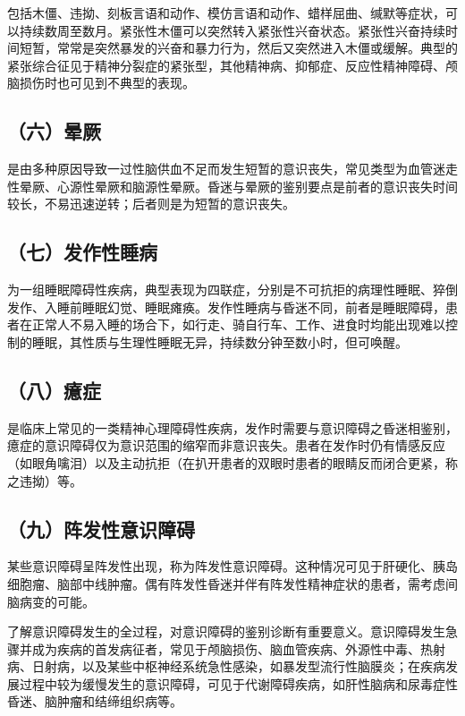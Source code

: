 包括木僵、违拗、刻板言语和动作、模仿言语和动作、蜡样屈曲、缄默等症状，可以持续数周至数月。紧张性木僵可以突然转入紧张性兴奋状态。紧张性兴奋持续时间短暂，常常是突然暴发的兴奋和暴力行为，然后又突然进入木僵或缓解。典型的紧张综合征见于精神分裂症的紧张型，其他精神病、抑郁症、反应性精神障碍、颅脑损伤时也可见到不典型的表现。

\subsection{（六）晕厥}

是由多种原因导致一过性脑供血不足而发生短暂的意识丧失，常见类型为血管迷走性晕厥、心源性晕厥和脑源性晕厥。昏迷与晕厥的鉴别要点是前者的意识丧失时间较长，不易迅速逆转；后者则是为短暂的意识丧失。

\subsection{（七）发作性睡病}

为一组睡眠障碍性疾病，典型表现为四联症，分别是不可抗拒的病理性睡眠、猝倒发作、入睡前睡眠幻觉、睡眠瘫痪。发作性睡病与昏迷不同，前者是睡眠障碍，患者在正常人不易入睡的场合下，如行走、骑自行车、工作、进食时均能出现难以控制的睡眠，其性质与生理性睡眠无异，持续数分钟至数小时，但可唤醒。

\subsection{（八）癔症}

是临床上常见的一类精神心理障碍性疾病，发作时需要与意识障碍之昏迷相鉴别，癔症的意识障碍仅为意识范围的缩窄而非意识丧失。患者在发作时仍有情感反应（如眼角噙泪）以及主动抗拒（在扒开患者的双眼时患者的眼睛反而闭合更紧，称之违拗）等。

\subsection{（九）阵发性意识障碍}

某些意识障碍呈阵发性出现，称为阵发性意识障碍。这种情况可见于肝硬化、胰岛细胞瘤、脑部中线肿瘤。偶有阵发性昏迷并伴有阵发性精神症状的患者，需考虑间脑病变的可能。

了解意识障碍发生的全过程，对意识障碍的鉴别诊断有重要意义。意识障碍发生急骤并成为疾病的首发病征者，常见于颅脑损伤、脑血管疾病、外源性中毒、热射病、日射病，以及某些中枢神经系统急性感染，如暴发型流行性脑膜炎；在疾病发展过程中较为缓慢发生的意识障碍，可见于代谢障碍疾病，如肝性脑病和尿毒症性昏迷、脑肿瘤和结缔组织病等。

